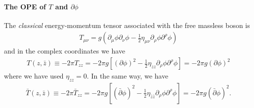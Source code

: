 \documentclass[10pt]{article}
\begin{document}
\paragraph{The OPE of $T$ and $\partial\phi$}
The \textit{classical} energy-momentum tensor associated with the free massless boson is
\begin{align}
    T_{\mu\nu}=g\left(\partial_\mu\phi\partial_\nu\phi-\frac{1}{2}\eta_{\mu\nu}\partial_\rho\phi\partial^\rho\phi\right)
\end{align}
and in the complex coordinates we have
\begin{align}
    T(z,\bar{z})\equiv-2\pi T_{zz}=-2\pi g\left[(\partial\phi)^2-\frac{1}{2}\eta_{zz}\partial_\rho\phi\partial^\rho\phi\right]=-2\pi g\left(\partial\phi\right)^2\label{eq:FFOPE:FB:T_classical}
\end{align}
where we have used $\eta_{zz}=0$.
In the same way, we have
\begin{align}
    \bar{T}(z,\bar{z})\equiv-2\pi \bar{T}_{zz}=-2\pi g\left[(\bar{\partial}\phi)^2-\frac{1}{2}\eta_{\bar{z}\bar{z}}\partial_\rho\phi\partial^\rho\phi\right]=-2\pi g\left(\bar{\partial}\phi\right)^2.\label{eq:FFOPE:FB:T_bar_classical}
\end{align}
\end{document}
